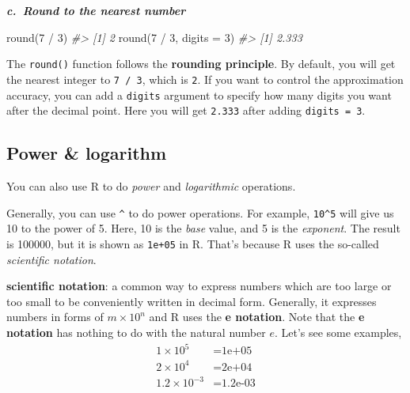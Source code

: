 \documentclass[
]{book}
\newenvironment{Shaded}{\begin{snugshade}}{\end{snugshade}}
\newcommand{\AttributeTok}[1]{\textcolor[rgb]{0.77,0.63,0.00}{#1}}
\newcommand{\CommentTok}[1]{\textcolor[rgb]{0.56,0.35,0.01}{\textit{#1}}}
\newcommand{\DecValTok}[1]{\textcolor[rgb]{0.00,0.00,0.81}{#1}}
\newcommand{\FunctionTok}[1]{\textcolor[rgb]{0.00,0.00,0.00}{#1}}
\newcommand{\NormalTok}[1]{#1}
\newcommand{\SpecialCharTok}[1]{\textcolor[rgb]{0.00,0.00,0.00}{#1}}
\newenvironment{blackbox}{
  \definecolor{shadecolor}{rgb}{0, 0, 0}  %
  \color{white}
  \begin{shaded}}
 {\end{shaded}}
\newenvironment{infobox}[1]
  {
  \begin{itemize}
  \renewcommand{\labelitemi}{
    \raisebox{-.7\height}[0pt][0pt]{
      {\setkeys{Gin}{width=3em,keepaspectratio}
        \texttt{[image: pics/\#1]}}
    }
  }
  \setlength{\fboxsep}{1em}
  \begin{blackbox}
  \item
  }
  {
  \end{blackbox}
  \end{itemize}
  }
\begin{document}
\textbf{\emph{c.~Round to the nearest number}}

\begin{Shaded}
\begin{Highlighting}[]
\FunctionTok{round}\NormalTok{(}\DecValTok{7} \SpecialCharTok{/} \DecValTok{3}\NormalTok{)   }
\CommentTok{\#\textgreater{} [1] 2}
\FunctionTok{round}\NormalTok{(}\DecValTok{7} \SpecialCharTok{/} \DecValTok{3}\NormalTok{, }\AttributeTok{digits =} \DecValTok{3}\NormalTok{)}
\CommentTok{\#\textgreater{} [1] 2.333}
\end{Highlighting}
\end{Shaded}

The \texttt{round()} function follows the \textbf{rounding principle}. By default, you will get the nearest integer to \texttt{7\ /\ 3}, which is \texttt{2}. If you want to control the approximation accuracy, you can add a \texttt{digits} argument to specify how many digits you want after the decimal point. Here you will get \texttt{2.333} after adding \texttt{digits\ =\ 3}.

\hypertarget{power-logarithm}{%
\subsection{Power \& logarithm}\label{power-logarithm}}

You can also use R to do \emph{power} and \emph{logarithmic} operations.

Generally, you can use \texttt{\^{}} to do power operations. For example, \texttt{10\^{}5} will give us 10 to the power of 5. Here, 10 is the \emph{base} value, and 5 is the \emph{exponent}. The result is 100000, but it is shown as \texttt{1e+05} in R. That's because R uses the so-called \emph{scientific notation}.

\begin{infobox}{caution}
\textbf{scientific notation}: a common way to express numbers which are too large or too small to be conveniently written in decimal form. Generally, it expresses numbers in forms of \(m \times 10^n\) and R uses the \textbf{e notation}. Note that the \textbf{e notation} has nothing to do with the natural number \(e\). Let's see some examples,
\begin{align}
1 \times 10^5 &= \mbox{1e+05}\\
2 \times 10^4 &= \mbox{2e+04}\\
1.2 \times 10^{-3} &= \mbox{1.2e-03}
\end{align}

\end{infobox}
\end{document}
